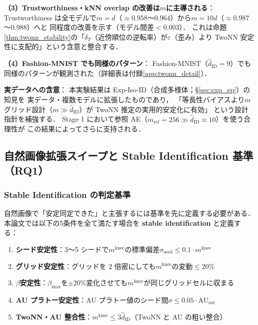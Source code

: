 \documentclass[11pt,a4paper]{jsarticle}
\newcommand{\AUsat}{\mathrm{AU}_{\mathrm{sat}}}
\newcommand{\mknee}{m^{\mathrm{knee}}}
\begin{document}
\textbf{（3）Trustworthiness・kNN overlap の改善は$m$に主導される}：
Trustworthiness は全モデルで$m=d$（$\approx 0.958$〜0.964）から$m=10d$（$\approx 0.987$〜0.988）へと
同程度の改善を示す（モデル間差$< 0.003$）．
これは命題\ref{thm:twonn_stability}の「$\delta_T$（近傍順位の逆転率）が$\varepsilon$（歪み）より
TwoNN 安定性に支配的」という含意と整合する．

\textbf{（4）Fashion-MNIST でも同様のパターン}：
Fashion-MNIST（$\hat{d}_\mathrm{ID}=9$）でも同様のパターンが観測された（詳細表は付録\ref{app:twonn_detail}）．

\textbf{実データへの含意}：
本実験結果は Exp-Iso-ID（合成多様体；§\ref{sec:exp_ep}）の知見を
実データ・複数モデルに拡張したものであり，
「等長性バイアスより$m$グリッド設計（$m \gg \hat{d}_\mathrm{ID}$）が TwoNN 推定の実用的安定化に有効」
という設計指針を補強する．
Stage 1 において参照 AE（$m_\mathrm{ref}=256 \gg \hat{d}_\mathrm{ID} \approx 10$）を使う合理性が
この結果によってさらに支持される．

\subsection{自然画像拡張スイープと Stable Identification 基準（RQ1）}\label{sec:exp_natimg_sweep}

\subsubsection*{Stable Identification の判定基準}\label{sec:natimg_stable_id}

自然画像で「安定同定できた」と主張するには基準を先に定義する必要がある．
本論文では以下の5条件を全て満たす場合を \textbf{stable identification} と定義する：

\begin{enumerate}
  \item \textbf{シード安定性}：3〜5 シードで$\mknee$の標準偏差$\sigma_\mathrm{seed} \leq 0.1 \cdot \mknee$
  \item \textbf{グリッド安定性}：グリッドを 2 倍密にしても$\mknee$の変動$\leq 20\%$
  \item \textbf{$\beta$安定性}：$\beta_{\max}$を$\pm 20\%$変化させても$\mknee$が同じグリッドセルに収まる
  \item \textbf{AU プラトー安定性}：AU プラトー値のシード間$\sigma \leq 0.05 \cdot \AUsat$
  \item \textbf{TwoNN・AU 整合性}：$\mknee \leq 3 \hat{d}_\mathrm{ID}$（TwoNN と AU の粗い整合）
\end{enumerate}
\end{document}
